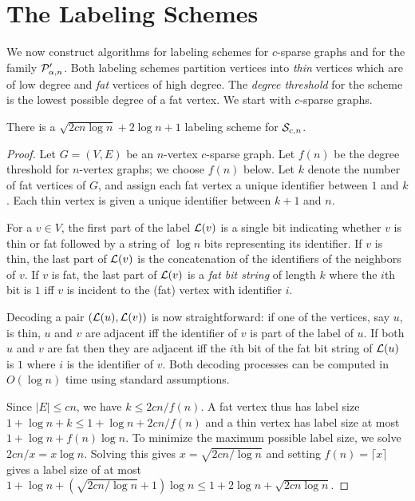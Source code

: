 
\section{The Labeling Schemes}
\label{sec:lab_schem}
We now construct algorithms for labeling schemes for $c$-sparse graphs and for the family $ \mathcal{P}'_{\alpha,n}$. Both labeling schemes partition vertices into \emph{thin} vertices which are of low degree and \emph{fat} vertices of high degree. The \emph{degree threshold} for the scheme is the lowest possible degree of a fat vertex. We start with $c$-sparse graphs.
\begin{theorem}\label{sparse-label}
There is a $\sqrt{2cn\log n} + 2\log n + 1$ labeling scheme for $ \mathcal{S}_{c,n}$.
\end{theorem}
\begin{proof}
Let $G=(V,E)$ be an $n$-vertex $c$-sparse graph. Let $f(n)$ be the degree threshold for $n$-vertex graphs; we choose $f(n)$ below. Let $k$ denote the number of fat vertices of $G$, and assign each fat vertex a unique identifier between $1$ and $k$. Each thin vertex is given a unique identifier between $k+1$ and $n$.

For a $v\in V$, the first part of the label $ \mathcal{L}(v)$ is a single bit indicating whether $v$ is thin or fat followed by a string of $\log n$ bits representing its identifier. If $v$ is thin, the last part of $ \mathcal{L}(v)$ is the concatenation of the identifiers of the neighbors of $v$. If $v$ is fat, the last part of $ \mathcal{L}(v)$ is a \emph{fat bit string} of length $k$ where the $i$th bit is $1$ iff $v$ is incident to the (fat) vertex with identifier $i$.

Decoding a pair $( \mathcal{L}(u), \mathcal{L}(v))$ is now straightforward: if one of the vertices, say $u$, is thin, $u$ and $v$ are adjacent iff the identifier of $v$ is part of the label of $u$. If both $u$ and $v$ are fat then they are adjacent iff the $i$th bit of the fat bit string of $ \mathcal{L}(u)$ is $1$ where $i$ is the identifier of $v$.
Both decoding processes can be computed in $O(\log n)$ time using standard assumptions.

Since $|E|\leq cn$, we have $k\leq 2cn/f(n)$. A fat vertex thus has label size $1 + \log n + k\leq 1 + \log n + 2cn/f(n)$ and a thin vertex has label size at most $1 + \log n + f(n)\log n$. To minimize the maximum possible label size, we solve $2cn/x = x\log n$. Solving this gives $x = \sqrt{2cn/\log n}$ and setting $f(n) = \lceil x\rceil$ gives a label size of at most $1 + \log n + (\sqrt{2cn/\log n} + 1)\log n\leq 1 + 2\log n + \sqrt{2cn\log n}$.
\end{proof}

